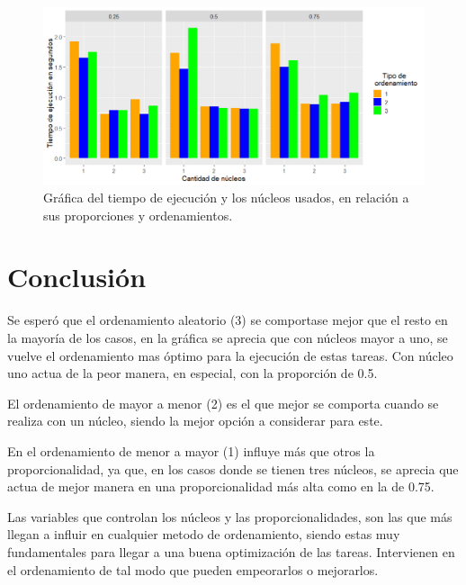 \documentclass{article}
\begin{document}
\begin{figure}[h!]
\centering\includegraphics[width=150mm]{GraficaP3.png}
\caption{Gr\'afica del tiempo de ejecuci\'on y los n\'ucleos usados, en relaci\'on a sus proporciones y ordenamientos.}
\label{fig:Grafica}
\end{figure}

\newpage

\section{Conclusi\'on}

Se esper\'o que el ordenamiento aleatorio (3) se comportase mejor que el resto en la mayor\'ia de los casos, en la gr\'afica se aprecia que con n\'ucleos mayor a uno, se vuelve el ordenamiento mas \'optimo para la ejecuci\'on de estas tareas. Con n\'ucleo uno actua de la peor manera, en especial, con la proporci\'on de 0.5.

El ordenamiento de mayor a menor (2) es el que mejor se comporta cuando se realiza con un n\'ucleo, siendo la mejor opci\'on a considerar para este.

En el ordenamiento de menor a mayor (1) influye m\'as que otros la proporcionalidad, ya que, en los casos donde se tienen tres n\'ucleos, se aprecia que actua de mejor manera en una proporcionalidad m\'as alta como en la de 0.75.

Las variables que controlan los n\'ucleos y las proporcionalidades, son las que m\'as llegan a influir en cualquier metodo de ordenamiento, siendo estas muy fundamentales para llegar a una buena optimizaci\'on de las tareas. Intervienen en el ordenamiento de tal modo que pueden empeorarlos o mejorarlos.



\end{document}
